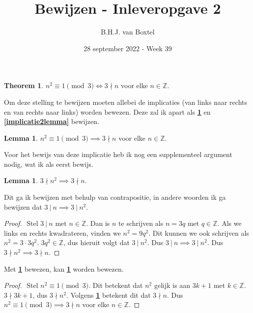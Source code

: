 \documentclass[12pt, dutch, a4paper]{article}
\theoremstyle{definition}
\newtheorem{theorem}{Theorem}
\newtheorem{lemma}{Lemma}[theorem]
\newtheorem{sublemma}{Lemma}[lemma]
\begin{document}
\title{Bewijzen - Inleveropgave 2}
\author{B.H.J. van Boxtel}
\date{28 september 2022 - Week 39} 

\maketitle
{} %

\begin{theorem} \label{maintheorem}
    $n^2 \equiv 1 \pmod{3} \iff 3 \nmid n$ voor elke $n \in \mathbb{Z}$. 
\end{theorem}   

Om deze stelling te bewijzen moeten allebei de implicaties 
(van links naar rechts en van rechts naar links) worden bewezen. Deze zal ik apart
als \textbf{\cref{implicatie1lemma}} en \textbf{\cref{implicatie2lemma}} bewijzen.

\begin{lemma} \label{implicatie1lemma}
    $n^2 \equiv 1 \pmod{3} \implies 3 \nmid n$ voor elke $n \in \mathbb{Z}$. 
\end{lemma}
Voor het bewijs van deze implicatie heb ik nog een supplementeel argument nodig, 
wat ik als eerst bewijs. 

\begin{sublemma} \label{sublemma1}
    $3 \nmid n^2 \implies 3 \nmid n$.
\end{sublemma}

Dit ga ik bewijzen met behulp van contrapositie, in andere woorden ik ga bewijzen dat
$3 \: | \: n \implies 3 \: | \: n^2$.
\begin{proof} $ $\newline
    Stel $3 \: | \: n$ met $n \in \mathbb{Z}$. \newline
    Dan is $n$ te schrijven als $n = 3q$ met $q \in \mathbb{Z}$. \newline
    Als we links en rechts kwadrateren, 
    vinden we $n^2 = 9q^2$. \newline
    Dit kunnen we ook schrijven als $n^2 = 3 \cdot 3q^2$. \newline
    $3q^2 \in \mathbb{Z}$, dus hieruit volgt dat $3 \: | \: n^2$. \newline 
    Dus $3 \: | \: n \implies 3 \: | \: n^2$. \newline
    Dus $3 \nmid n^2 \implies 3 \nmid n$.
\end{proof}

Met \textbf{\cref{sublemma1}} bewezen, 
kan \textbf{\cref{implicatie1lemma}} worden bewezen.
\begin{proof} $ $\newline
    Stel $n^2 \equiv 1 \pmod{3}$. \newline
    Dit betekent dat $n^2$ gelijk is aan $3k+1$ met $k \in \mathbb{Z}$. \newline
    $3 \nmid 3k + 1$, dus $3 \nmid n^2$. \newline
    Volgens \textbf{\cref{sublemma1}} betekent dit dat $3 \nmid n$. \newline
    Dus $n^2 \equiv 1 \pmod{3} \implies 3 \nmid n$ voor elke $n \in \mathbb{Z}$.
\end{proof}
\end{document}
